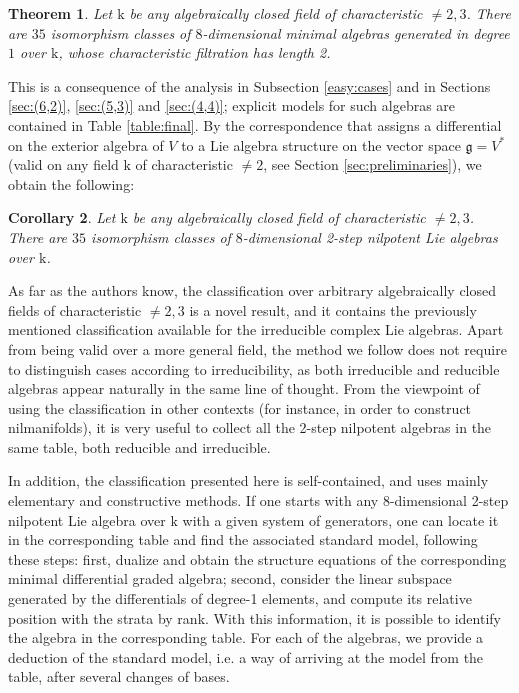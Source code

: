 \documentclass[10pt,reqno]{amsart}
\newcommand{\kk}{\mathrm{k}}
\newcommand{\frg}{\mathfrak{g}}
\newtheorem{theorem}{Theorem}
\newtheorem{corollary}[theorem]{Corollary}
\theoremstyle{definition}
\begin{document}
\begin{theorem} \label{thm:main}
Let $\kk$ be any algebraically closed field of characteristic $\ne 2,3$. There are $35$ isomorphism classes of $8$-dimensional minimal algebras generated in degree $1$ over $\kk$, whose characteristic filtration has length 2.
\end{theorem}%

This is a consequence of the analysis in Subsection \ref{easy:cases} and in Sections \ref{sec:(6,2)}, \ref{sec:(5,3)} and \ref{sec:(4,4)}; explicit models for such algebras are contained in Table \ref{table:final}. By the correspondence that assigns a differential on the exterior algebra of $V$ to a Lie algebra structure on the vector space $\frg=V^*$ (valid on any field $\kk$ of characteristic $\neq 2$, see Section \ref{sec:preliminaries}), we obtain the following:

\begin{corollary}
Let $\kk$ be any algebraically closed field of characteristic $\ne 2,3$. There are $35$ isomorphism classes of $8$-dimensional 2-step nilpotent Lie algebras over $\kk$.
\end{corollary}

As far as the authors know, the classification over arbitrary algebraically closed fields of characteristic $\ne 2, 3$ is a novel result, and it contains the previously mentioned classification available for the irreducible complex Lie algebras.
Apart from being valid over a more general field, the method we follow does not require to distinguish cases according to irreducibility, as both irreducible and reducible algebras appear naturally in the same line of thought. 
From the viewpoint of using the classification in other contexts (for instance, in order to construct nilmanifolds), it is very useful to collect all the 2-step nilpotent algebras in the same table, both reducible and irreducible. 

In addition, the classification presented here is self-contained, and uses mainly elementary and constructive methods. If one starts with any 8-dimensional 2-step nilpotent Lie algebra over $\kk$ with a given system of generators, one can locate it in the corresponding table and find the associated standard model, following these steps: first, dualize and obtain the structure equations of the corresponding minimal differential graded algebra; second, consider the linear subspace generated by the differentials of degree-1 elements, and compute its relative position with the strata by rank. With this information, it is possible to identify the algebra in the corresponding table. For each of the algebras, we provide a deduction of the standard model, i.e. a way of arriving at the model from the table, after several changes of bases.
\end{document}
